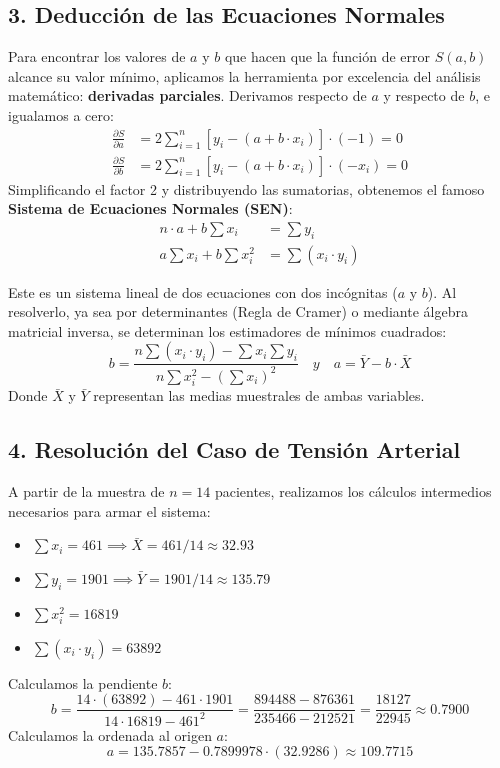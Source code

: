 \documentclass[11pt,a4paper]{article}
\begin{document}
\subsection{3. Deducción de las Ecuaciones Normales}
    Para encontrar los valores de $a$ y $b$ que hacen que la función de error $S(a, b)$ alcance su valor mínimo, aplicamos la herramienta por excelencia del análisis matemático: \textbf{derivadas parciales}. Derivamos respecto de $a$ y respecto de $b$, e igualamos a cero:
    \begin{align*}
        \frac{\partial S}{\partial a} &= 2 \sum_{i=1}^n \left[ y_i - (a + b \cdot x_i) \right] \cdot (-1) = 0 \\
        \frac{\partial S}{\partial b} &= 2 \sum_{i=1}^n \left[ y_i - (a + b \cdot x_i) \right] \cdot (-x_i) = 0
    \end{align*}
    Simplificando el factor 2 y distribuyendo las sumatorias, obtenemos el famoso \textbf{Sistema de Ecuaciones Normales (SEN)}:
    \begin{align*}
        n \cdot a + b \sum x_i &= \sum y_i \\
        a \sum x_i + b \sum x_i^2 &= \sum (x_i \cdot y_i)
    \end{align*}

    Este es un sistema lineal de dos ecuaciones con dos incógnitas ($a$ y $b$). Al resolverlo, ya sea por determinantes (Regla de Cramer) o mediante álgebra matricial inversa, se determinan los estimadores de mínimos cuadrados:
    \begin{equation}
        b = \frac{n \sum (x_i \cdot y_i) - \sum x_i \sum y_i}{n \sum x_i^2 - (\sum x_i)^2} \quad y \quad a = \bar{Y} - b \cdot \bar{X}
    \end{equation}
    Donde $\bar{X}$ y $\bar{Y}$ representan las medias muestrales de ambas variables.
 

\subsection{4. Resolución del Caso de Tensión Arterial}
    A partir de la muestra de $n = 14$ pacientes, realizamos los cálculos intermedios necesarios para armar el sistema:
    \begin{itemize}
        \item $\sum x_i = 461 \implies \bar{X} = 461/14 \approx 32.93$
        \item $\sum y_i = 1901 \implies \bar{Y} = 1901/14 \approx 135.79$
        \item $\sum x_i^2 = 16819$
        \item $\sum (x_i \cdot y_i) = 63892$
    \end{itemize}
    Calculamos la pendiente $b$:
    \[ b = \frac{14 \cdot (63892) - 461 \cdot 1901}{14 \cdot 16819 - 461^2} = \frac{894488 - 876361}{235466 - 212521} = \frac{18127}{22945} \approx \mathbf{0.7900} \]
    Calculamos la ordenada al origen $a$:
    \[ a = 135.7857 - 0.7899978 \cdot (32.9286) \approx \mathbf{109.7715} \]
\end{document}
